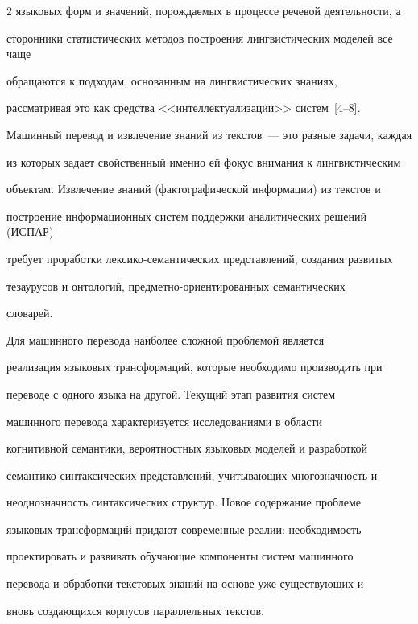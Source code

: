 \begin{multicols}{2}
языковых форм и значений, по\-рож\-да\-емых в процессе речевой деятельности, а 


сторонники статистических методов построения лингвистических моделей все чаще 


обращаются к подходам, основанным на лингвистических знаниях, 


рас\-смат\-ри\-вая это как средства <<интеллектуализации>> систем~[4--8].





Машинный перевод и извлечение знаний из текстов~--- это разные задачи, каждая 


из которых задает свойственный именно ей фокус внимания к лингвистическим 


объектам. Извлечение знаний (фактографической информации) из текстов и 


построение информационных систем поддержки аналитических решений (ИСПАР) 


требует проработки лексико-семантических представлений, создания развитых 


тезаурусов и онтологий, пред\-мет\-но-ори\-ен\-ти\-ро\-ван\-ных семантических 


словарей.





Для машинного перевода наиболее сложной проблемой является


реализация языковых трансформаций, которые необходимо производить при


переводе с одного языка на другой. Текущий этап развития систем


машинного перевода характеризуется исследованиями в области


когнитивной семантики, вероятностных языковых моделей и разработкой


семантико-синтаксических пред\-став\-ле\-ний, учитывающих многозначность и


неоднозначность синтаксических структур. Новое содержание проблеме


языковых трансформаций придают современные реалии: необходимость


проектировать и развивать обучающие компоненты систем машинного


перевода и обработки текстовых знаний на основе уже существующих и


вновь со\-зда\-ющих\-ся корпусов параллельных текстов.






\end{multicols}
